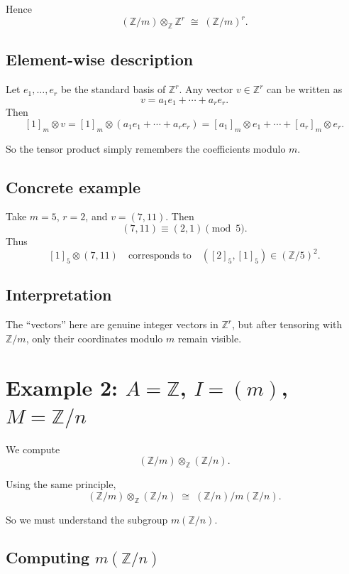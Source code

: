 \documentclass[12pt,a4paper]{article}
\theoremstyle{plain}
\theoremstyle{definition}      %
\begin{document}
	Hence
	\[
	(\mathbb Z/m)\otimes_{\mathbb Z}\mathbb Z^r \;\cong\; (\mathbb Z/m)^r.
	\]
	
	\subsection{Element-wise description}
	
	Let \(e_1,\dots,e_r\) be the standard basis of \(\mathbb Z^r\). Any vector \(v\in\mathbb Z^r\) can be written as
	\[
	v = a_1e_1+\cdots+a_re_r.
	\]
	Then
	\[
	[1]_m\otimes v
	=
	[1]_m\otimes(a_1e_1+\cdots+a_re_r)
	=
	[a_1]_m\otimes e_1+\cdots+[a_r]_m\otimes e_r.
	\]
	
	So the tensor product simply remembers the coefficients modulo \(m\).
	
	\subsection{Concrete example}
	
	Take \(m=5\), \(r=2\), and \(v=(7,11)\). Then
	\[
	(7,11)\equiv (2,1)\pmod 5.
	\]
	Thus
	\[
	[1]_5\otimes (7,11)
	\quad\text{corresponds to}\quad
	([2]_5,[1]_5)\in (\mathbb Z/5)^2.
	\]
	
	\subsection{Interpretation}
	
	The ``vectors'' here are genuine integer vectors in \(\mathbb Z^r\), but after tensoring with \(\mathbb Z/m\), only their coordinates modulo \(m\) remain visible.
	
	\section{Example 2: \texorpdfstring{$A=\mathbb Z$, $I=(m)$, $M=\mathbb Z/n$}{A=Z, I=(m), M=Z/n}}
	
	We compute
	\[
	(\mathbb Z/m)\otimes_{\mathbb Z}(\mathbb Z/n).
	\]
	
	Using the same principle,
	\[
	(\mathbb Z/m)\otimes_{\mathbb Z}(\mathbb Z/n)
	\;\cong\;
	(\mathbb Z/n)/m(\mathbb Z/n).
	\]
	
	So we must understand the subgroup \(m(\mathbb Z/n)\).
	
	\subsection{Computing \texorpdfstring{$m(\mathbb Z/n)$}{m(Z/n)}}
	
\end{document}
